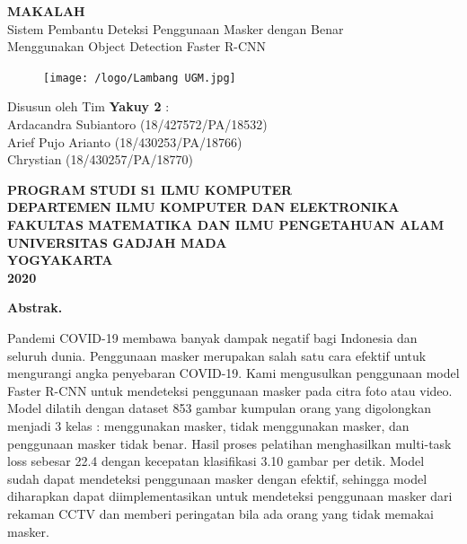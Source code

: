 \documentclass{article}
\begin{document}
  \begin{titlepage}
    \begin{center}
      
      \null
      {
      	\LARGE \bfseries MAKALAH}\\
      [0.5cm]
      {\Large Sistem Pembantu Deteksi Penggunaan Masker dengan Benar\\Menggunakan Object Detection Faster R-CNN}\\
          
      \vspace{2cm}

      \begin{figure}[H]
        \centering
        \texttt{[image: /logo/Lambang UGM.jpg]}
      \end{figure}
          
      \vspace{3cm}
    
      {\Large 
      Disusun oleh Tim \bfseries Yakuy 2} {\Large :\\
      \vspace{0.5cm}
      Ardacandra Subiantoro (18/427572/PA/18532)\\
      Arief Pujo Arianto (18/430253/PA/18766)\\
      Chrystian (18/430257/PA/18770)\\
      }


      \vspace{2cm}

      {\normalsize \bfseries
      PROGRAM STUDI S1 ILMU KOMPUTER\\
      DEPARTEMEN ILMU KOMPUTER DAN ELEKTRONIKA\\
      FAKULTAS MATEMATIKA DAN ILMU PENGETAHUAN ALAM\\
      UNIVERSITAS GADJAH MADA\\
      YOGYAKARTA\\
      \vspace{0.2cm}
      2020
      }
            
    \end{center}
  \end{titlepage}


  \newpage
  \textbf{Abstrak.} 
  \par Pandemi COVID-19 membawa banyak dampak negatif bagi Indonesia dan seluruh dunia. Penggunaan masker merupakan salah satu cara efektif untuk mengurangi angka penyebaran COVID-19. Kami mengusulkan penggunaan model Faster R-CNN untuk mendeteksi penggunaan masker pada citra foto atau video. Model dilatih dengan dataset 853 gambar kumpulan orang yang digolongkan menjadi 3 kelas : menggunakan masker, tidak menggunakan masker, dan penggunaan masker tidak benar. Hasil proses pelatihan menghasilkan multi-task loss sebesar 22.4 dengan kecepatan klasifikasi 3.10 gambar per detik. Model sudah dapat mendeteksi penggunaan masker dengan efektif, sehingga model diharapkan dapat diimplementasikan untuk mendeteksi penggunaan masker dari rekaman CCTV dan memberi peringatan bila ada orang yang tidak memakai masker.
  \newpage
  \tableofcontents
  \newpage
\end{document}
